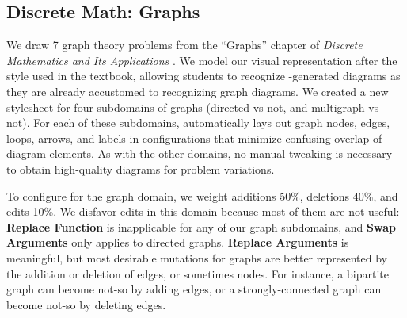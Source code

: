 \subsection{Discrete Math: Graphs}
\label{sec:graphs}


We draw 7 graph theory problems from the ``Graphs'' chapter of \textit{Discrete Mathematics and Its Applications} \cite[Chapter~10]{rosen1999discrete}.  We model our visual representation after the style used in the textbook, allowing students to recognize \Edgeworth-generated diagrams as they are already accustomed to recognizing graph diagrams. We created a new \Penrose stylesheet for four subdomains of graphs (directed vs not, and multigraph vs not). For each of these subdomains, \Edgeworth automatically lays out graph nodes, edges, loops, arrows, and labels in configurations that minimize confusing overlap of diagram elements. As with the other domains, no manual tweaking is necessary to obtain high-quality diagrams for problem variations. 


To configure \Edgeworth for the graph domain, we weight additions 50\%, deletions 40\%, and edits 10\%. We disfavor edits in this domain because most of them are not useful: \textbf{Replace Function} is inapplicable for any of our graph subdomains, and \textbf{Swap Arguments} only applies to directed graphs. \textbf{Replace Arguments} is meaningful, but most desirable mutations for graphs are better represented by the addition or deletion of edges, or sometimes nodes. For instance, a bipartite graph can become not-so by adding edges, or a strongly-connected graph can become not-so by deleting edges. 

